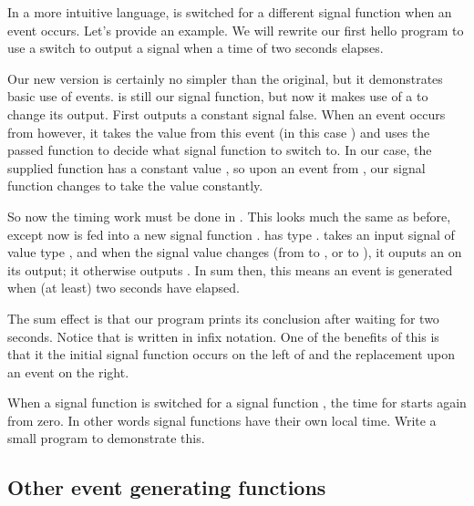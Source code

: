In a more intuitive language,  is switched for a different signal function when an event occurs. Let's provide an example. We will rewrite our first hello program to use a switch to output a  signal when a time of two seconds elapses.



Our new version is certainly no simpler than the original, but it demonstrates basic use of events.  is still our signal function, but now it makes use of a  to change its output. First  outputs a constant signal false. When an event occurs from  however, it takes the value from this event (in this case \hask{()}) and uses the passed function to decide what signal function to switch to. In our case, the supplied function has a constant value , so upon an event from , our signal function changes to take the value  constantly.

So now the timing work must be done in . This looks much the same as before, except now  is fed into a new signal function .  has type .  takes an input signal of value type , and when the signal value changes (from  to , or  to ), it ouputs an  on its output; it otherwise outputs . In sum then, this means an event is generated when (at least) two seconds have elapsed.

The sum effect is that our program prints its conclusion after waiting for two seconds. Notice that  is written in infix notation. One of the benefits of this is that it the initial signal function occurs on the left of  and the replacement upon an event on the right.

\begin{exercise}
When a signal function  is switched for a signal function , the time for  starts again from zero. In other words signal functions have their own local time. Write a small program to demonstrate this.
\end{exercise}

\subsection{Other event generating functions}


